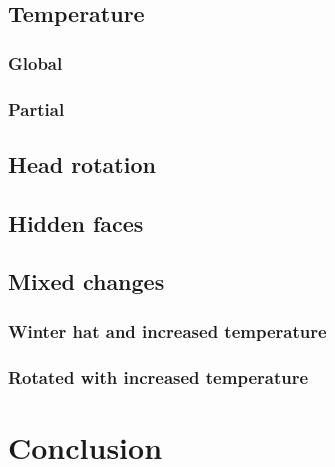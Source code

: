 \documentclass[pdftex]{article}
\begin{document}
\subsection{Temperature}
\subsubsection{Global}

\subsubsection{Partial}

\subsection{Head rotation}

\subsection{Hidden faces}

\subsection{Mixed changes}
\subsubsection{Winter hat and increased temperature}

\subsubsection{Rotated with increased temperature}

\section{Conclusion}
\end{document}
